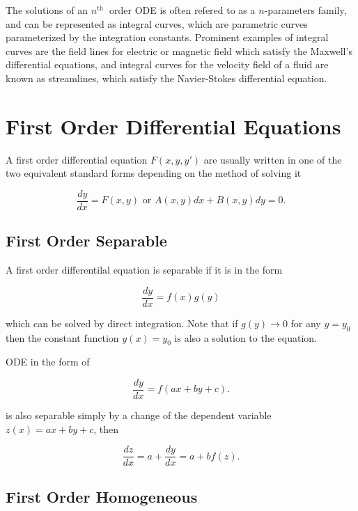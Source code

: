 \documentclass[english,a4paper,12pt]{report}
\begin{document}
The solutions of an \(n^{\text{th }} \) order ODE is often refered to as a \(n\)-parameters family, and can be represented as integral curves, which are parametric curves parameterized by the integration constants. Prominent examples of integral curves are the field lines for electric or magnetic field which satisfy the Maxwell's differential equations, and integral curves for the velocity field of a fluid are known as streamlines, which satisfy the Navier-Stokes differential equation.



\chapter{First Order Differential Equations}

A first order differential equation \(F(x,y,y')\) are usually written in one of the two equivalent standard forms depending on the method of solving it

\begin{equation}
    \frac{dy}{dx} = F(x,y) \text { or } A(x,y) dx + B(x,y) dy = 0. 
\end{equation}

\section{First Order Separable}

A first order differentilal equation is separable if it is in the form

\begin{equation}
    \frac{dy}{dx} = f(x)g(y)
\end{equation}

which can be solved by direct integration. Note that if \(g(y) \rightarrow 0\) for any \(y=y_0 \) then the constant function \(y(x) = y_0 \) is also a solution to the equation.

ODE in the form of 

\begin{equation}
    \frac{dy}{dx} = f(ax+by+c).
\end{equation}

is also separable simply by a change of the dependent variable \(z(x) = ax + by + c\), then 

\begin{equation}
    \frac{dz}{dx} = a + \frac{dy}{dx} = a + bf(z).
\end{equation}

\section{First Order Homogeneous} \label{homo} 
\end{document}
